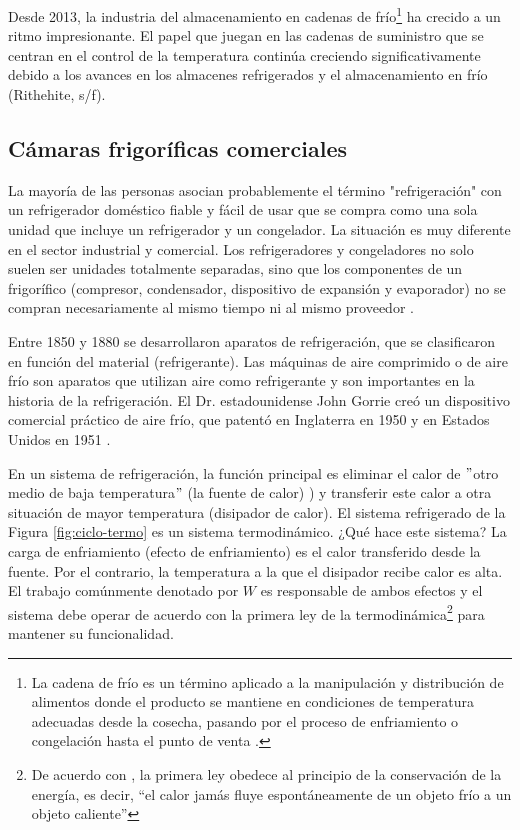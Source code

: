 Desde 2013, la industria del almacenamiento en cadenas de frío\footnote{La cadena de frío es un término aplicado a la manipulación y distribución de alimentos donde el producto se mantiene en condiciones de temperatura adecuadas desde la cosecha, pasando por el proceso de enfriamiento o congelación hasta el punto de venta \cite{Hundy1984}.}   ha crecido a un ritmo impresionante. El papel que juegan en las cadenas de suministro que se centran en el control de la temperatura continúa creciendo significativamente debido a los avances en los almacenes refrigerados y el almacenamiento en frío (Rithehite, s/f). 

\subsection{Cámaras frigoríficas comerciales}

La mayoría de las personas asocian probablemente el término "refrigeración" con un refrigerador doméstico fiable y fácil de usar que se compra como una sola unidad que incluye un refrigerador y un congelador. La situación es muy diferente en el sector industrial y comercial. Los refrigeradores y congeladores no solo suelen ser unidades totalmente separadas, sino que los componentes de un frigorífico (compresor, condensador, dispositivo de expansión y evaporador) no se compran necesariamente al mismo tiempo ni al mismo proveedor \cite{carson2013}. 

Entre 1850 y 1880 se desarrollaron aparatos de refrigeración, que se clasificaron en función del material (refrigerante). Las máquinas de aire comprimido o de aire frío son aparatos que utilizan aire como refrigerante y son importantes en la historia de la refrigeración. El Dr. estadounidense John Gorrie creó un dispositivo comercial práctico de aire frío, que patentó en Inglaterra en 1950 y en Estados Unidos en 1951 \cite{doi1952}.

En un sistema de refrigeración, la función principal es eliminar el calor de $"$otro medio de baja temperatura$"$ (la fuente de calor) ) y transferir este calor a otra situación de mayor temperatura (disipador de calor). El sistema refrigerado de la Figura \ref{fig:ciclo-termo} es un sistema termodinámico. ¿Qué hace este sistema? La carga de enfriamiento (efecto de enfriamiento) es el calor transferido desde la fuente. Por el contrario, la temperatura a la que el disipador recibe calor es alta. El trabajo comúnmente denotado por $W$ es responsable de ambos efectos y el sistema debe operar de acuerdo con la primera ley de la termodinámica\footnote{De acuerdo con \citeauthor{cengel1999}, \citeyear{cengel1999} la primera ley obedece al principio de la conservación de la energía, es decir, “el calor jamás fluye espontáneamente de un objeto frío a un objeto caliente”}  para mantener su funcionalidad.


